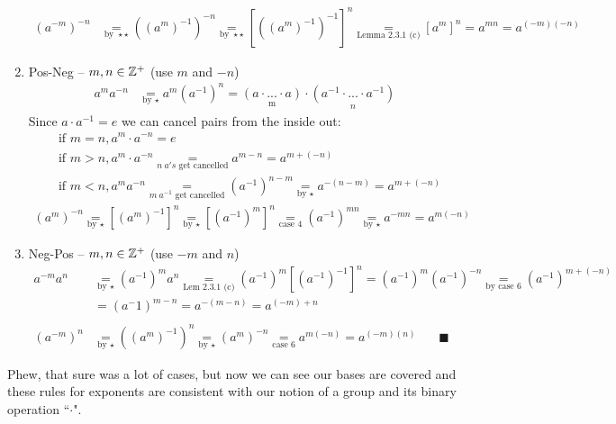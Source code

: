 \begin{proposition}
\begin{enumerate}[label=Case \arabic*:]
\begin{align}
        (a^{-m})^{-n} &\underset{\text{by }\star\star}{=} ((a^m)^{-1})^{-n} \underset{\text{by }\star\star}{=} [((a^m)^{-1})^{-1}]^{n} \underset{\text{Lemma 2.3.1 (c)}}{=} [a^m]^n= a^{mn}= a^{(-m)(-n)} \nonumber 
    \end{align}
    \item Pos-Neg -- $m,n\in {\mathbb{ Z}}^+$ (use $m$ and $-n$)
    \begin{align}
        a^m a^{-n}&\underset{\text{by $\star$}}{=} a^m (a^{-1})^n = \underset{\text{m}}{(a\cdot ... \cdot a)}\cdot \underset{n}{(a^{-1}\cdot ... \cdot a^{-1})} \nonumber
    \end{align}
    Since $a\cdot a^{-1}=e$ we can cancel pairs from the inside out:
    \begin{align}
        &\text{if } m=n, a^m\cdot a^{-n}=e \nonumber \\
        &\text{if } m>n, a^m\cdot a^{-n} \underset{n \ a's\text{ get cancelled}}{=}a^{m-n}=a^{m+(-n)} \nonumber\\
        &\text{if } m<n, a^ma^{-n} \underset{m \ a^{-1} \text{ get cancelled}}{=} (a^{-1})^{n-m} \underset{\text{by $\star$}}{=} a^{-(n-m)}=a^{m+(-n)}\nonumber
    \end{align}
    \begin{align}
        (a^m)^{-n}\underset{\text{by $\star$}}{=} [(a^m)^{-1}]^n\underset{\text{by $\star$}}{=}[(a^{-1})^m]^n \underset{\text{case 4}}{=}(a^{-1})^{mn} \underset{\text{by $\star$}}{=}a^{-mn}=a^{m(-n)}\nonumber
    \end{align}
    \item Neg-Pos -- $m,n\in {\mathbb{ Z}}^+$ (use $-m$ and $n$)\\
    \begin{align}
        a^{-m}a^{n}&\underset{\text{by $\star$}}{=}(a^{-1})^m a^n\underset{\text{Lem 2.3.1 (c)}}{=}(a^{-1})^m[(a^{-1})^{-1}]^n = (a^{-1})^m(a^{-1})^{-n}\underset{\text{by case 6}}{=} (a^{-1})^{m+(-n)} \nonumber \\
        &=(a^-1)^{m-n}= a^{-(m-n)}= a^{(-m)+n} \nonumber \\ \nonumber \\
        (a^{-m})^n&\underset{\text{by $\star$}}{=}((a^m)^{-1})^n\underset{\text{by $\star$}}{=}(a^m)^{-n}\underset{\text{case 6}}{=}a^{m(-n)}=a^{(-m)(n)} \ \ \ \ \ \ \ \ \blacksquare\nonumber
    \end{align} 
\end{enumerate}
Phew, that sure was a lot of cases, but now we can see our bases are covered and these rules for exponents are consistent with our notion of a group and its binary operation ``$\cdot$".
\end{proposition}

